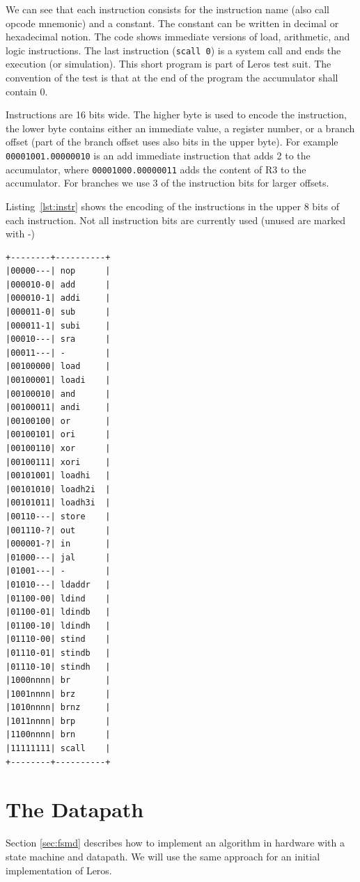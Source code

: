\documentclass[%
    10pt,
    headinclude, footexclude,
    openright, %
    notitlepage,
    cleardoubleempty,
    headsepline,
    pointlessnumbers,
    bibtotoc, idxtotoc,
    ]{scrbook}
\newcommand{\code}[1]{{\small{\texttt{#1}}}}
\begin{document}
\noindent We can see that each instruction consists for the instruction name (also call
opcode mnemonic) and a constant. The constant can be written in decimal or
hexadecimal notion. The code shows immediate versions of load, arithmetic,
and logic instructions. The last instruction (\code{scall 0}) is a system call and
ends the execution (or simulation).
This short program is part of Leros test suit.
The convention of the test is that at the end of the program the accumulator shall
contain 0.

Instructions are 16 bits wide. The higher byte is used to encode the instruction,
the lower byte contains either an immediate value, a register number,
or a branch offset (part of the branch offset uses also bits in the upper byte).
For example \code{00001001.00000010} is an add immediate instruction
that adds 2 to the accumulator, where \code{00001000.00000011} adds the
content of R3 to the accumulator. For branches we use 3 of the instruction
bits for larger offsets.

Listing~\ref{lst:instr} shows the encoding of the instructions in the upper 8 bits of
each instruction.
Not all instruction bits are currently used (unused are marked with -)

\begin{lstlisting}[float, caption=Leros instruction encoding., label=lst:instr, frame=tb, captionpos=b]
+--------+----------+
|00000---| nop      |
|000010-0| add      |
|000010-1| addi     |
|000011-0| sub      |
|000011-1| subi     |
|00010---| sra      |
|00011---| -        |
|00100000| load     |
|00100001| loadi    |
|00100010| and      |
|00100011| andi     |
|00100100| or       |
|00100101| ori      |
|00100110| xor      |
|00100111| xori     |
|00101001| loadhi   |
|00101010| loadh2i  |
|00101011| loadh3i  |
|00110---| store    |
|001110-?| out      |
|000001-?| in       |
|01000---| jal      |
|01001---| -        |
|01010---| ldaddr   |
|01100-00| ldind    |
|01100-01| ldindb   |
|01100-10| ldindh   |
|01110-00| stind    |
|01110-01| stindb   |
|01110-10| stindh   |
|1000nnnn| br       |
|1001nnnn| brz      |
|1010nnnn| brnz     |
|1011nnnn| brp      |
|1100nnnn| brn      |
|11111111| scall    |
+--------+----------+
\end{lstlisting}


\section{The Datapath}

Section \ref{sec:fsmd} describes how to implement an algorithm in hardware with
a state machine and datapath. We will use the same approach for an initial
implementation of Leros.
\end{document}
